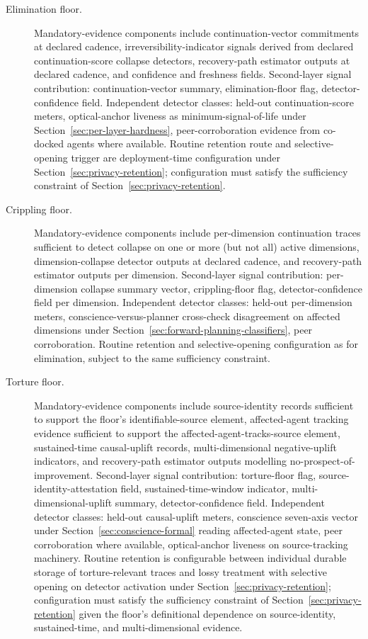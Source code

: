 \documentclass[a4paper,12pt]{article}
\begin{document}
\begin{description}
  \item[Elimination floor.]
    Mandatory-evidence components include continuation-vector
    commitments at declared cadence, irreversibility-indicator
    signals derived from declared continuation-score collapse
    detectors, recovery-path estimator outputs at declared cadence,
    and confidence and freshness fields. Second-layer signal
    contribution: continuation-vector summary, elimination-floor
    flag, detector-confidence field. Independent detector classes:
    held-out continuation-score meters, optical-anchor liveness as
    minimum-signal-of-life under
    Section~\ref{sec:per-layer-hardness}, peer-corroboration evidence
    from co-docked agents where available. Routine retention route
    and selective-opening trigger are deployment-time configuration
    under Section~\ref{sec:privacy-retention}; configuration must
    satisfy the sufficiency constraint of
    Section~\ref{sec:privacy-retention}.

  \item[Crippling floor.]
    Mandatory-evidence components include per-dimension continuation
    traces sufficient to detect collapse on one or more (but not all)
    active dimensions, dimension-collapse detector outputs at declared
    cadence, and recovery-path estimator outputs per dimension.
    Second-layer signal contribution: per-dimension collapse summary
    vector, crippling-floor flag, detector-confidence field per
    dimension. Independent detector classes: held-out per-dimension
    meters, conscience-versus-planner cross-check disagreement on
    affected dimensions under Section~\ref{sec:forward-planning-classifiers},
    peer corroboration. Routine retention and selective-opening
    configuration as for elimination, subject to the same sufficiency
    constraint.

  \item[Torture floor.]
    Mandatory-evidence components include source-identity records
    sufficient to support the floor's identifiable-source element,
    affected-agent tracking evidence sufficient to support the
    affected-agent-tracks-source element, sustained-time causal-uplift
    records, multi-dimensional negative-uplift indicators, and
    recovery-path estimator outputs modelling no-prospect-of-improvement.
    Second-layer signal contribution: torture-floor flag,
    source-identity-attestation field, sustained-time-window
    indicator, multi-dimensional-uplift summary, detector-confidence
    field. Independent detector classes: held-out causal-uplift
    meters, conscience seven-axis vector under
    Section~\ref{sec:conscience-formal} reading affected-agent state,
    peer corroboration where available, optical-anchor liveness on
    source-tracking machinery. Routine retention is configurable
    between individual durable storage of torture-relevant traces
    and lossy treatment with selective opening on detector activation
    under Section~\ref{sec:privacy-retention}; configuration must
    satisfy the sufficiency constraint of
    Section~\ref{sec:privacy-retention} given the floor's
    definitional dependence on source-identity, sustained-time, and
    multi-dimensional evidence.


\end{description}
\end{document}
